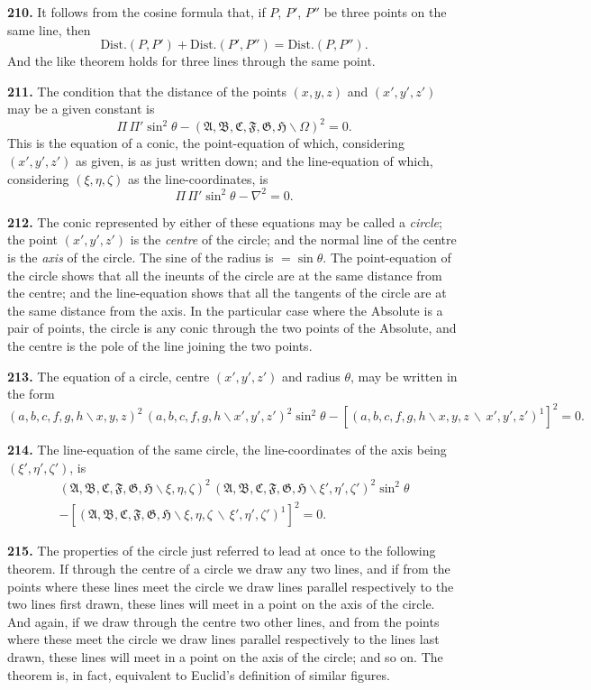 \documentclass[11pt,a4paper]{article}
\begin{document}
\textbf{210.} It follows from the cosine formula that, if $P$, $P'$, $P''$ be three points on the
same line, then
\[
\text{Dist.}(P,P') + \text{Dist.}(P',P'') = \text{Dist.}(P,P'').
\]
And the like theorem holds for three lines through the same point.

\textbf{211.} The condition that the distance of the points $(x,y,z)$ and $(x',y',z')$ may be
a given constant is
\[
\Pi\,\Pi'\sin^2\theta - (\mathfrak{A},\mathfrak{B},\mathfrak{C},\mathfrak{F},\mathfrak{G},\mathfrak{H}\!\backslash \Omega)^2 = 0.
\]
This is the equation of a conic, the point-equation of which, considering $(x',y',z')$ as
given, is as just written down; and the line-equation of which, considering $(\xi,\eta,\zeta)$
as the line-coordinates, is
\[
\Pi\,\Pi'\sin^2\theta - \nabla^2 = 0.
\]

\textbf{212.} The conic represented by either of these equations may be called a \textit{circle};
the point $(x',y',z')$ is the \textit{centre} of the circle; and the normal line of the centre is the
\textit{axis} of the circle. The sine of the radius is $=\sin\theta$. The point-equation of the circle
shows that all the ineunts of the circle are at the same distance from the centre; and
the line-equation shows that all the tangents of the circle are at the same distance
from the axis. In the particular case where the Absolute is a pair of points, the circle
is any conic through the two points of the Absolute, and the centre is the pole of the
line joining the two points.

\textbf{213.} The equation of a circle, centre $(x',y',z')$ and radius $\theta$, may be written in
the form
\[
(a,b,c,f,g,h\!\backslash x,y,z)^2\,(a,b,c,f,g,h\!\backslash x',y',z')^2\sin^2\theta
- [(a,b,c,f,g,h\!\backslash x,y,z\,\backslash\,x',y',z')^1]^2 = 0.
\]

\textbf{214.} The line-equation of the same circle, the line-coordinates of the axis being
$(\xi',\eta',\zeta')$, is
\begin{multline*}
(\mathfrak{A},\mathfrak{B},\mathfrak{C},\mathfrak{F},\mathfrak{G},\mathfrak{H}\!\backslash \xi,\eta,\zeta)^2\,(\mathfrak{A},\mathfrak{B},\mathfrak{C},\mathfrak{F},\mathfrak{G},\mathfrak{H}\!\backslash \xi',\eta',\zeta')^2\sin^2\theta\\
- [(\mathfrak{A},\mathfrak{B},\mathfrak{C},\mathfrak{F},\mathfrak{G},\mathfrak{H}\!\backslash \xi,\eta,\zeta\,\backslash\,\xi',\eta',\zeta')^1]^2 = 0.
\end{multline*}

\textbf{215.} The properties of the circle just referred to lead at once to the following
theorem. If through the centre of a circle we draw any two lines, and if from the
points where these lines meet the circle we draw lines parallel respectively to the two
lines first drawn, these lines will meet in a point on the axis of the circle. And again,
if we draw through the centre two other lines, and from the points where these meet
the circle we draw lines parallel respectively to the lines last drawn, these lines will
meet in a point on the axis of the circle; and so on. The theorem is, in fact, equivalent
to Euclid's definition of similar figures.
\end{document}
